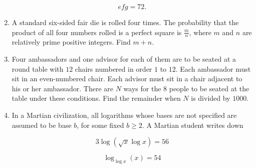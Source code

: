 \documentclass{article}
\begin{document}
\begin{enumerate}[label=\arabic*., itemsep=0.5em]
\begin{equation*}
efg=72.
\end{equation*}
\par \vspace{0.5em}\item A standard six-sided fair die is rolled four times. The probability that the product of all four numbers rolled is a perfect square is \(\tfrac{m}{n}\), where \(m\) and \(n\) are relatively prime positive integers. Find \(m+n\).\par \vspace{0.5em}\item Four ambassadors and one advisor for each of them are to be seated at a round table with \(12\) chairs numbered in order \(1\) to \(12\). Each ambassador must sit in an even-numbered chair. Each advisor must sit in a chair adjacent to his or her ambassador. There are \(N\) ways for the \(8\) people to be seated at the table under these conditions. Find the remainder when \(N\) is divided by \(1000\).\par \vspace{0.5em}\item In a Martian civilization, all logarithms whose bases are not specified are assumed to be base \(b\), for some fixed \(b\ge2\). A Martian student writes down

\begin{equation*}
3\log(\sqrt{x}\log x)=56
\end{equation*}


\begin{equation*}
\log_{\log x}(x)=54
\end{equation*}


\end{enumerate}
\end{document}
